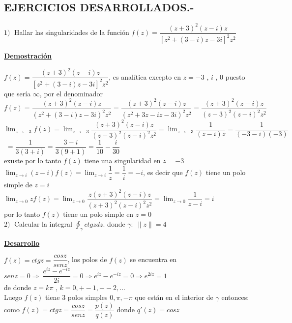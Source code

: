 \documentclass[10pt,a4paper]{article}
\begin{document}
\subsection{EJERCICIOS DESARROLLADOS.-}
$1) \; $ Hallar las singularidades de la función $f(z) = \dfrac{(z+3)^2(z-i) z}{[z^2 + (3 - i)z - 3i]^2 z^2}$ 
\begin{center}
\textbf{\underline{Demostración}}
\end{center}
 $f(z) = \dfrac{(z+3)^2(z-i) z}{[z^2 + (3 - i)z - 3i]^2 z^2}$, es analítica excepto en $z = -3$ , $i$ , $0$ puesto que sería $\infty$, por el denominador \\
 $f(z) = \dfrac{(z+3)^2(z-i) z}{(z^2 + (3 - i)z - 3i)^2 z^2} =  \dfrac{(z+3)^2(z-i) z}{(z^2 + 3z - iz - 3i)^2 z^2} =  \dfrac{(z+3)^2(z-i) z}{(z-3)^2 (z-i)^2 z^2}$\\
$\displaystyle{\lim_{z \to -3} f(z) = \lim_{z \to -3} \dfrac{(z+3)^2(z-i) z}{(z-3)^2 (z-i)^2 z^2} = \lim_{z \to -3} \dfrac{1}{(z-i)z} = \dfrac{1}{(-3-i)(-3)}}$\\
$\; = \dfrac{1}{3(3+i)} = \dfrac{3-i}{3(9+1)} = \dfrac{1}{10} - \dfrac{i}{30}$\\
exuste por lo tanto $f(z)$ tiene una singularidad en $z = -3$\\
$\displaystyle{\lim_{z \to i} (z-i) f(z) = \lim_{z \to i} \dfrac{1}{z} = \dfrac{1}{i} = -i}$, es decir que $f(z)$ tiene un polo simple de $z = i$\\
$\displaystyle{\lim_{z \to 0} z f(z) = \lim_{z \to 0} \dfrac{z(z+3)^2 (z-i)z}{(z+3)^2(z-i)^2z^2} = \lim_{z \to 0} \dfrac{1}{z-i} = i}$\\
por lo tanto $f(z)$ tiene un polo simple en $z = 0$\\
$2) \; $ Calcular la integral $\displaystyle{\oint_{\gamma} ctg z dz}$. donde $\gamma : \; \parallel z \parallel = 4 $\\
\begin{center}
\textbf{\underline{Desarrollo}}
\end{center}
$f(z) = ctgz = \dfrac{cos z}{sen z}$, los polos de $f(z)$ se encuentra en \\
$sen z = 0 \Rightarrow \: \dfrac{e^{iz}-e^{-iz}}{2i} = 0 \Rightarrow e^{iz} - e^{-iz} = 0 \Rightarrow e^{2iz} = 1$\\
de donde $z = k \pi$ , $k = 0,+-1,+-2,...$ \\
Luego $f(z)$ tiene 3 polos simples $0, \pi , -\pi$ que están en el interior de $\gamma$ entonces: \\
como $f(z) = ctg z = \dfrac{cos z}{sen z} = \dfrac{p(z)}{q(z)}$ donde $q'(z) = cos z$\\
\end{document}
